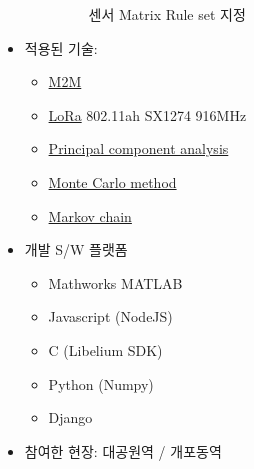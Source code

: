 \documentclass[10pt,a4paper,ragged2e]{altacv}
\begin{document}
\begin{fullwidth}
\begin{itemize}
\begin{itemize}
\begin{figure}[ht!]
\begin{fullwidth}
					            \caption*{센서 Matrix Rule set 지정}
				            \end{fullwidth}
			            \end{figure}
		      \end{itemize}

		\item 적용된 기술:
		      \begin{itemize}
			      \item \href{https://en.wikipedia.org/wiki/Machine_to_machine}{M2M}
			      \item \href{https://lora-alliance.org/}{LoRa} 802.11ah SX1274 916MHz
			      \item \href{https://en.wikipedia.org/wiki/Principal_component_analysis}{Principal component analysis}
			      \item \href{https://en.wikipedia.org/wiki/Monte_Carlo_method}{Monte Carlo method}
			      \item \href{https://en.wikipedia.org/wiki/Markov_chain}{Markov chain}
		      \end{itemize}
		\item 개발 S/W 플랫폼
		      \begin{itemize}
			      \item Mathworks MATLAB
			      \item Javascript (NodeJS)
			      \item C (Libelium SDK)
			      \item Python (Numpy)
			      \item Django
		      \end{itemize}
		\item 참여한 현장: 대공원역 / 개포동역
	\end{itemize}

	\divider



\end{fullwidth}
\end{document}
